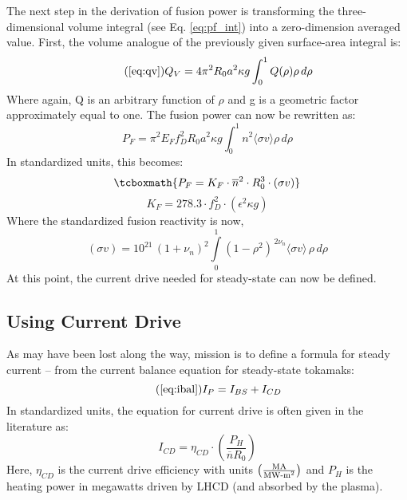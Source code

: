  The next step in the derivation of fusion power is transforming the three-dimensional volume integral (see Eq. \ref{eq:pf_int}) into a zero-dimension averaged value. First, the volume analogue of the previously given surface-area integral is:
 \begin{equation}
  	\tag{\ref{eq:qv}}
 	Q_V = 4 \pi^2 R_0 a^2 \kappa g \int_0^1 Q(\rho) \rho \, d\rho
 \end{equation}
 Where again, Q is an arbitrary function of $\rho$ and g is a geometric factor approximately equal to one. The fusion power can now be rewritten as:
 \begin{equation}
 	P_F = \pi^2 E_F f_D^2 R_0 a^2 \kappa g \int_0^1 n^2 \langle \sigma v \rangle \rho \, d\rho
 \end{equation}
In standardized units, this becomes:
\begin{equation}
	\label{eq:pf}
	\tcboxmath{
	P_F = K_F \cdot \overline{n}^2 \cdot R_0^3  \cdot (\sigma v)
	}
	\myequations{Fusion Power -- $P_F$}
\end{equation}
\begin{equation}
  K_F = 278.3 \cdot f_D^2 \cdot ( \epsilon^2 \kappa g )
\end{equation}
Where the standardized fusion reactivity is now,
\begin{equation}
   (\sigma v) = 10^{21} \, (1+\nu_n)^2 \int\limits_0^1 ( 1 - \rho^2 ) ^ { \, 2 \nu_n} \langle \sigma v \rangle \, \rho \, d\rho
\end{equation}
At this point, the current drive needed for steady-state can now be defined.

\subsection{Using Current Drive}

As may have been lost along the way,  mission is to define a formula for steady current -- from the current balance equation for steady-state tokamaks:
\begin{equation}
		\tag{\ref{eq:ibal}}
		I_P = I_{BS} + I_{CD}
\end{equation}
In standardized units, the equation for current drive is often given in the literature as: \cite{itercd}
\begin{equation}
	I_{CD} = \eta_{CD} \cdot \left( \frac{P_H}{\overline n R_0} \right)
\end{equation}
Here, $\eta_{CD}$ is the current drive efficiency with units $ \left(
\frac{ \textnormal{MA} }{ \textnormal{MW-m}^2 } \right) $ and $P_H$ is the heating power in megawatts driven by LHCD (and absorbed by the plasma).

